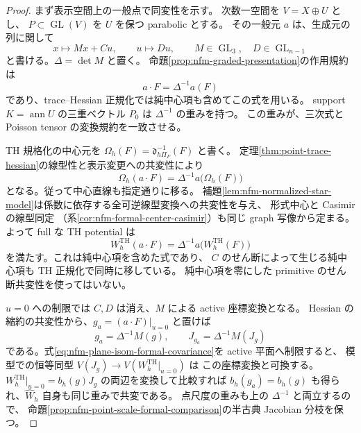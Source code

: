 \begin{proof}
まず表示空間上の一般点で同変性を示す。
次数一空間を $V=X\oplus U$ とし、
$P\subset\operatorname{GL}(V)$ を $U$ を保つ parabolic とする。
その一般元 $a$ は、生成元の列に関して
\[
 x\longmapsto Mx+Cu,\qquad u\longmapsto Du,
 \qquad M\in\operatorname{GL}_3,\quad D\in\operatorname{GL}_{n-1}
\]
と書ける。$\Delta=\det M$ と置く。
命題\ref{prop:nfm-graded-presentation}の作用規約は
\begin{equation}\label{eq:nfm-plane-isom-parabolic-action}
 a\cdot F=\Delta^{-1}a(F)
\end{equation}
であり、trace--Hessian 正規化では純中心項も含めてこの式を用いる。
support $K=\operatorname{ann}U$ の三重ベクトル $P_0$ は $\Delta^{-1}$ の重みを持つ。
この重みが、三次式と Poisson tensor の変換規約を一致させる。

TH 規格化の中心元を
$\Omega_h(F)=\mathfrak d_{h\Pi_F}^{-1}(F)$ と書く。
定理\ref{thm:point-trace-hessian}の線型性と表示変更への共変性により
\begin{equation}\label{eq:nfm-plane-isom-th-covariance}
 \Omega_h(a\cdot F)=\Delta^{-1}a\bigl(\Omega_h(F)\bigr)
\end{equation}
となる。従って中心直線も指定通りに移る。
補題\ref{lem:nfm-normalized-star-model}は係数に依存する全可逆線型変換への共変性を与え、
形式中心と Casimir の線型同定
（系\ref{cor:nfm-formal-center-casimir}）も同じ graph 写像から定まる。
よって full な TH potential は
\begin{equation}\label{eq:nfm-plane-isom-formal-covariance}
 W_h^{\mathrm{TH}}(a\cdot F)
   =\Delta^{-1}a\bigl(W_h^{\mathrm{TH}}(F)\bigr)
\end{equation}
を満たす。これは純中心項を含めた式であり、
$C$ のせん断によって生じる純中心項も TH 正規化で同時に移している。
純中心項を零にした primitive のせん断共変性を使ってはいない。

$u=0$ への制限では $C,D$ は消え、$M$ による active 座標変換となる。
Hessian の縮約の共変性から、$g_a=(a\cdot F)|_{u=0}$ と置けば
\[
 g_a=\Delta^{-1}M(g),\qquad
 J_{g_a}=\Delta^{-1}M(J_g)
\]
である。式\eqref{eq:nfm-plane-isom-formal-covariance}を active 平面へ制限すると、
模型での恒等同型 $V(J_g)\to V(W_h^{\mathrm{TH}}|_{u=0})$ は
この座標変換と可換する。
$W_h^{\mathrm{TH}}|_{u=0}=b_h(g)J_g$ の両辺を変換して比較すれば
$b_h(g_a)=b_h(g)$ も得られ、$\widehat W_h$ 自身も同じ重みで共変である。
点尺度の重みも上の $\Delta^{-1}$ と両立するので、
命題\ref{prop:nfm-point-scale-formal-comparison}の半古典 Jacobian 分枝を保つ。


\end{proof}
